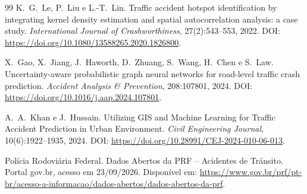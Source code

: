 \begin{thebibliography}{99}
    K.~G.~Le, P.~Liu e L.-T.~Lin.
    \newblock Traffic accident hotspot identification by integrating kernel density estimation and spatial autocorrelation analysis: a case study.
    \newblock \emph{International Journal of Crashworthiness}, 27(2):543--553, 2022.
    \newblock DOI: \url{https://doi.org/10.1080/13588265.2020.1826800}.

    X.~Gao, X.~Jiang, J.~Haworth, D.~Zhuang, S.~Wang, H.~Chen e S.~Law.
    \newblock Uncertainty-aware probabilistic graph neural networks for road-level traffic crash prediction.
    \newblock \emph{Accident Analysis \& Prevention}, 208:107801, 2024.
    \newblock DOI: \url{https://doi.org/10.1016/j.aap.2024.107801}.

    A.~A.~Khan e J.~Hussain.
    \newblock Utilizing {GIS} and Machine Learning for Traffic Accident Prediction in Urban Environment.
    \newblock \emph{Civil Engineering Journal}, 10(6):1922--1935, 2024.
    \newblock DOI: \url{https://doi.org/10.28991/CEJ-2024-010-06-013}.

    Pol{\'i}cia Rodovi{\'a}ria Federal.
    \newblock Dados Abertos da {PRF} -- Acidentes de Tr{\'a}nsito.
    \newblock Portal gov.br, acesso em 23/09/2026.
    \newblock Dispon{\'i}vel em: \url{https://www.gov.br/prf/pt-br/acesso-a-informacao/dados-abertos/dados-abertos-da-prf}.

    \end{thebibliography}
